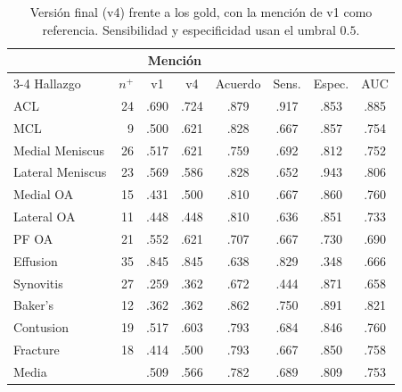 \begin{table}[t]
  \caption{Versión final (v4) frente a los gold, con la mención de v1 como referencia.
    Sensibilidad y especificidad usan el umbral $0.5$.}
  \label{tab:ext-final}
  \centering
  \small
  \begin{tabular}{@{}lrcccccc@{}}
    \toprule
    & & \multicolumn{2}{c}{Mención} & & & & \\
    \cmidrule(lr){3-4}
    Hallazgo & $n^{+}$ & v1 & v4 & Acuerdo & Sens. & Espec. & AUC \\
    \midrule
    ACL              & 24 & .690 & .724 & .879 & .917 & .853 & .885 \\
    MCL              &  9 & .500 & .621 & .828 & .667 & .857 & .754 \\
    Medial Meniscus  & 26 & .517 & .621 & .759 & .692 & .812 & .752 \\
    Lateral Meniscus & 23 & .569 & .586 & .828 & .652 & .943 & .806 \\
    Medial OA        & 15 & .431 & .500 & .810 & .667 & .860 & .760 \\
    Lateral OA       & 11 & .448 & .448 & .810 & .636 & .851 & .733 \\
    PF OA            & 21 & .552 & .621 & .707 & .667 & .730 & .690 \\
    Effusion         & 35 & .845 & .845 & .638 & .829 & .348 & .666 \\
    Synovitis        & 27 & .259 & .362 & .672 & .444 & .871 & .658 \\
    Baker's          & 12 & .362 & .362 & .862 & .750 & .891 & .821 \\
    Contusion        & 19 & .517 & .603 & .793 & .684 & .846 & .760 \\
    Fracture         & 18 & .414 & .500 & .793 & .667 & .850 & .758 \\
    \midrule
    Media            &    & .509 & .566 & .782 & .689 & .809 & .753 \\
    \bottomrule
  \end{tabular}
\end{table}

